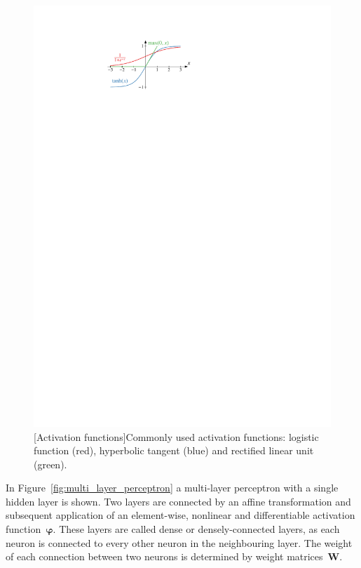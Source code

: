 \begin{figure}[htb]
\begin{minipage}[t]{0.4\textwidth}
    \includegraphics{./figures/theory/activation_functions.pdf}
    [Activation functions]{Commonly used activation
      functions: logistic function (red), hyperbolic tangent (blue) and
      rectified linear unit (green).}
    \label{fig:activation_functions}
  \end{minipage}
\end{figure}
In Figure~\ref{fig:multi_layer_perceptron} a multi-layer perceptron with a
single hidden layer is shown. Two layers are connected by an affine
transformation and subsequent application of an element-wise, nonlinear and
differentiable activation function~$\bm{\varphi}$. These layers are called dense
or densely-connected layers, as each neuron is connected to every other neuron
in the neighbouring layer. The weight of each connection between two neurons is
determined by weight matrices~$\mathbf{W}$.

